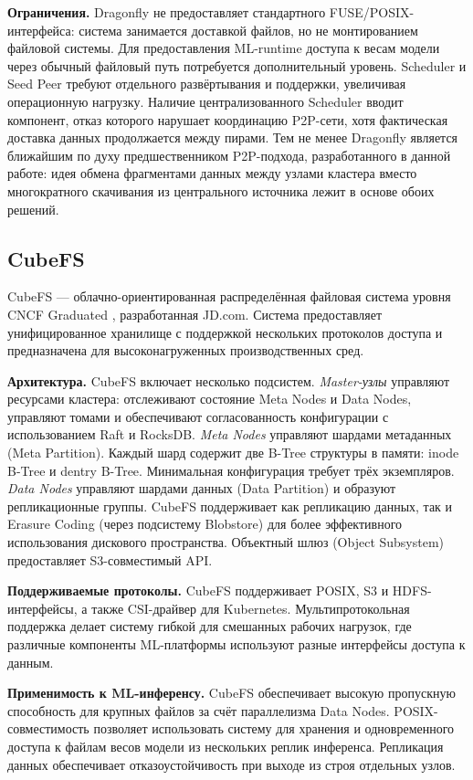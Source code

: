 \textbf{Ограничения.} Dragonfly не предоставляет стандартного FUSE/POSIX-интерфейса: система занимается доставкой файлов, но не монтированием файловой системы. Для предоставления ML-runtime доступа к весам модели через обычный файловый путь потребуется дополнительный уровень. Scheduler и Seed Peer требуют отдельного развёртывания и поддержки, увеличивая операционную нагрузку. Наличие централизованного Scheduler вводит компонент, отказ которого нарушает координацию P2P-сети, хотя фактическая доставка данных продолжается между пирами. Тем не менее Dragonfly является ближайшим по духу предшественником P2P-подхода, разработанного в данной работе: идея обмена фрагментами данных между узлами кластера вместо многократного скачивания из центрального источника лежит в основе обоих решений.

\subsection*{CubeFS}

CubeFS --- облачно-ориентированная распределённая файловая система уровня CNCF Graduated \cite{cubefs_arch}, разработанная JD.com. Система предоставляет унифицированное хранилище с поддержкой нескольких протоколов доступа и предназначена для высоконагруженных производственных сред.

\textbf{Архитектура.} CubeFS включает несколько подсистем. \textit{Master-узлы} управляют ресурсами кластера: отслеживают состояние Meta Nodes и Data Nodes, управляют томами и обеспечивают согласованность конфигурации с использованием Raft и RocksDB. \textit{Meta Nodes} управляют шардами метаданных (Meta Partition). Каждый шард содержит две B-Tree структуры в памяти: inode B-Tree и dentry B-Tree. Минимальная конфигурация требует трёх экземпляров. \textit{Data Nodes} управляют шардами данных (Data Partition) и образуют репликационные группы. CubeFS поддерживает как репликацию данных, так и Erasure Coding (через подсистему Blobstore) для более эффективного использования дискового пространства. Объектный шлюз (Object Subsystem) предоставляет S3-совместимый API.

\textbf{Поддерживаемые протоколы.} CubeFS поддерживает POSIX, S3 и HDFS-интерфейсы, а также CSI-драйвер для Kubernetes. Мультипротокольная поддержка делает систему гибкой для смешанных рабочих нагрузок, где различные компоненты ML-платформы используют разные интерфейсы доступа к данным.

\textbf{Применимость к ML-инференсу.} CubeFS обеспечивает высокую пропускную способность для крупных файлов за счёт параллелизма Data Nodes. POSIX-совместимость позволяет использовать систему для хранения и одновременного доступа к файлам весов модели из нескольких реплик инференса. Репликация данных обеспечивает отказоустойчивость при выходе из строя отдельных узлов.

